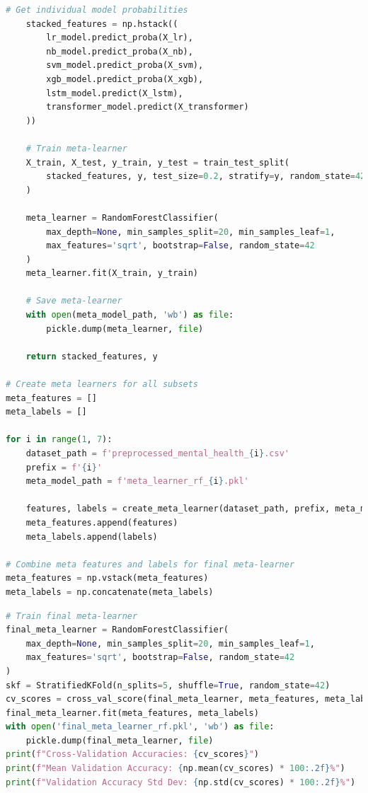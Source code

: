     \begin{tcolorbox}[colback=gray!5!white, colframe=gray!80!black, boxrule=0.5pt, title=Hierarchical Ensemble Model 1] 
        \begin{lstlisting}[language=Python]
    # Get individual model probabilities
    stacked_features = np.hstack((
        lr_model.predict_proba(X_lr),
        nb_model.predict_proba(X_nb),
        svm_model.predict_proba(X_svm),
        xgb_model.predict_proba(X_xgb),
        lstm_model.predict(X_lstm),
        transformer_model.predict(X_transformer)
    ))

    # Train meta-learner
    X_train, X_test, y_train, y_test = train_test_split(
        stacked_features, y, test_size=0.2, stratify=y, random_state=42
    )

    meta_learner = RandomForestClassifier(
        max_depth=None, min_samples_split=20, min_samples_leaf=1,
        max_features='sqrt', bootstrap=False, random_state=42
    )
    meta_learner.fit(X_train, y_train)

    # Save meta-learner
    with open(meta_model_path, 'wb') as file:
        pickle.dump(meta_learner, file)

    return stacked_features, y

# Create meta learners for all subsets
meta_features = []
meta_labels = []

for i in range(1, 7):
    dataset_path = f'preprocessed_mental_health_{i}.csv'
    prefix = f'{i}'
    meta_model_path = f'meta_learner_rf_{i}.pkl'

    features, labels = create_meta_learner(dataset_path, prefix, meta_model_path)
    meta_features.append(features)
    meta_labels.append(labels)

# Combine meta features and labels for final meta-learner
meta_features = np.vstack(meta_features)
meta_labels = np.concatenate(meta_labels)
\end{lstlisting}
\end{tcolorbox}
\begin{tcolorbox}[colback=gray!5!white, colframe=gray!80!black, boxrule=0.5pt, title=Hierarchical Ensemble Model 1] 
    \begin{lstlisting}[language=Python]
# Train final meta-learner
final_meta_learner = RandomForestClassifier(
    max_depth=None, min_samples_split=20, min_samples_leaf=1,
    max_features='sqrt', bootstrap=False, random_state=42
)
skf = StratifiedKFold(n_splits=5, shuffle=True, random_state=42)
cv_scores = cross_val_score(final_meta_learner, meta_features, meta_labels, cv=skf, scoring='accuracy')
final_meta_learner.fit(meta_features, meta_labels)
with open('final_meta_learner_rf.pkl', 'wb') as file:
    pickle.dump(final_meta_learner, file)
print(f"Cross-Validation Accuracies: {cv_scores}")
print(f"Mean Validation Accuracy: {np.mean(cv_scores) * 100:.2f}%")
print(f"Validation Accuracy Std Dev: {np.std(cv_scores) * 100:.2f}%")
    \end{lstlisting}
\end{tcolorbox}

